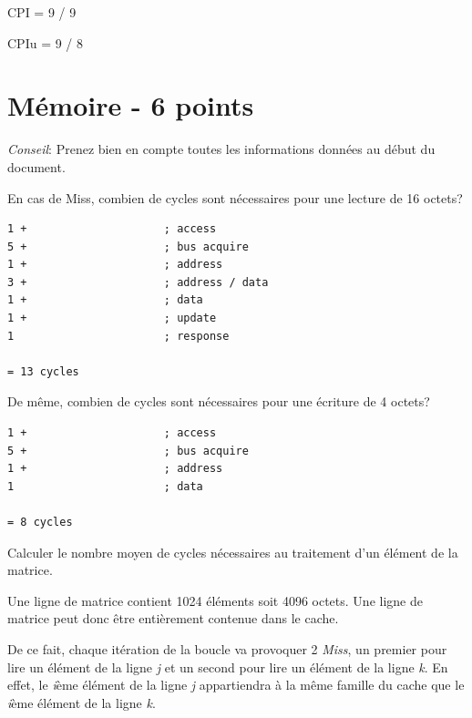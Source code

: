 {\begin{correction}
  CPI = 9 / 9

  CPIu = 9 / 8

\end{correction}

%
%

\section{M\'emoire - 6 points}

\textit{Conseil}: Prenez bien en compte toutes les informations
donn\'ees au d\'ebut du document.

En cas de Miss, combien de cycles sont n\'ecessaires pour une lecture de
16 octets?

\begin{correction}

\begin{verbatim}
1 +                     ; access
5 +                     ; bus acquire
1 +                     ; address
3 +                     ; address / data
1 +                     ; data
1 +                     ; update
1                       ; response

= 13 cycles
\end{verbatim}

\end{correction}

De m\^eme, combien de cycles sont n\'ecessaires pour une \'ecriture de
4 octets?

\begin{correction}

\begin{verbatim}
1 +                     ; access
5 +                     ; bus acquire
1 +                     ; address
1                       ; data

= 8 cycles
\end{verbatim}

\end{correction}

Calculer le nombre moyen de cycles n\'ecessaires au traitement d'un
\'el\'ement de la matrice.

\begin{correction}

Une ligne de matrice contient 1024 \'el\'ements soit 4096 octets. Une ligne
de matrice peut donc \^etre enti\`erement contenue dans le cache.

De ce fait, chaque it\'eration de la boucle va provoquer 2 \textit{Miss},
un premier pour lire un \'el\'ement de la ligne \textit{j} et un second
pour lire un \'el\'ement de la ligne \textit{k}. En effet, le \textit{i}\`eme
\'el\'ement de la ligne \textit{j} appartiendra \`a la m\^eme famille
du cache que le \textit{i}\`eme \'el\'ement de la ligne \textit{k}.


\end{correction}}
